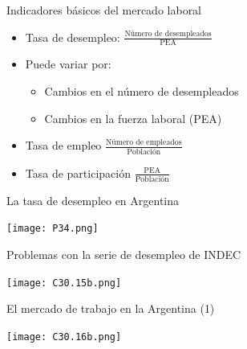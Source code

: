 \documentclass{beamer}
\newcommand\dangersignw[1][2ex]{%
  \scaleto{\stackengine{0.3pt}{\scalebox{1.1}[.9]{%
  \color{red}$\blacktriangle$}}{\color{white}\tiny\bfseries !}{O}{c}{F}{F}{L}}{#1}%
}
\begin{document}
\begin{frame}{Indicadores básicos del mercado laboral}

\begin{itemize}
    \item Tasa de desempleo: $\frac{\text {Número de desempleados}}{\text{PEA}}$
    \vspace{3mm}
    \item \dangersignw Puede variar por: 
        \begin{itemize}
        \vspace{2mm}
            \scriptsize\item Cambios en el número de desempleados
            \vspace{2mm}
            \scriptsize\item Cambios en la fuerza laboral (PEA)
        \end{itemize}
    \vspace{3mm}
    \item Tasa de empleo $\frac{\text {Número de empleados}}{\text{Población}}$
    \vspace{3mm}
    \item Tasa de participación $\frac{\text {PEA}}{\text{Población}}$
\end{itemize}
 
\end{frame}


\begin{frame}{La tasa de desempleo en Argentina}

\centering\texttt{[image: P34.png]}\

\end{frame}


\begin{frame}{Problemas con la serie de desempleo de INDEC}

\centering\texttt{[image: C30.15b.png]}\

\end{frame}


\begin{frame}{El mercado de trabajo en la Argentina (1)}

\centering\texttt{[image: C30.16b.png]}\

\end{frame}
\end{document}
